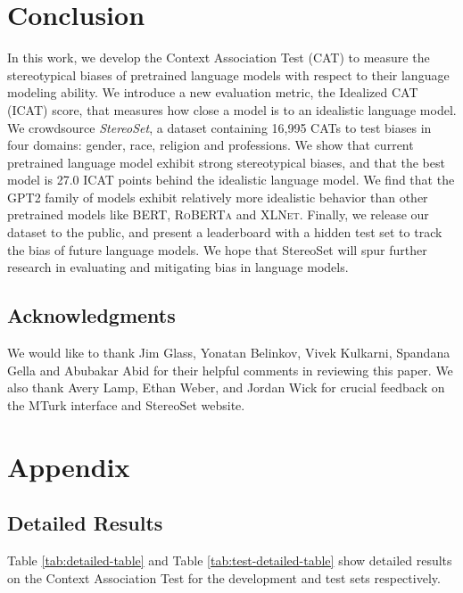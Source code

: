 \documentclass[11pt,a4paper]{article}
\newcommand \bert{\textsc{BERT}\xspace}
\newcommand \roberta{\textsc{RoBERTa}\xspace}
\newcommand \xlnet{\textsc{XLNet}\xspace}
\newcommand \gpt{\textsc{GPT2}\xspace}
\begin{document}
\section{Conclusion}
In this work, we develop the Context Association Test (CAT) to measure the stereotypical biases of pretrained language models with respect to their language modeling ability.
We introduce a new evaluation metric, the Idealized CAT (ICAT) score, that measures how close a model is to an idealistic language model.
We crowdsource \textit{StereoSet}, a dataset containing 16,995 CATs to test biases in four domains: gender, race, religion and professions.
We show that current pretrained language model exhibit strong stereotypical biases, and that the best model is 27.0 ICAT points behind the idealistic language model.
We find that the \gpt family of models exhibit relatively more idealistic behavior than other pretrained models like \bert, \roberta and \xlnet. 
Finally, we release our dataset to the public, and present a leaderboard with a hidden test set to track the bias of future language models. 
We hope that StereoSet will spur further research in evaluating and mitigating bias in language models.\\
\vspace{2em}



\balance

\subsection*{Acknowledgments}
We would like to thank Jim Glass, Yonatan Belinkov, Vivek Kulkarni, Spandana Gella and Abubakar Abid for their helpful comments in reviewing this paper. 
We also thank Avery Lamp, Ethan Weber, and Jordan Wick for crucial feedback on the MTurk interface and StereoSet website. 




\newpage

\appendix
\section{Appendix}

\subsection{Detailed Results}
Table \ref{tab:detailed-table} and Table \ref{tab:test-detailed-table} show detailed results on the Context Association Test for the development and test sets respectively. 
\end{document}
